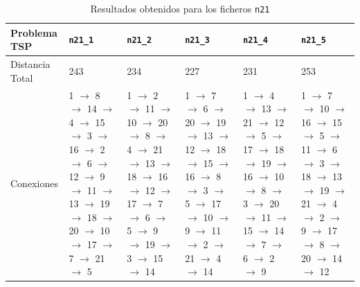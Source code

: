 \documentclass[a4paper,11pt]{article}
\begin{document}
\begin{table}[!htbp]
\label{results_n21}
\centering
\begin{tabularx}{\textwidth}{|p{2cm}|X|X|X|X|X|}
\hline
Problema TSP  & \texttt{n21\_1}	& \texttt{n21\_2}	& \texttt{n21\_3}	& \texttt{n21\_4}	& \texttt{n21\_5}	\\ \hline
Distancia Total & 243	& 234	& 227	& 231	& 253	\\ \hline
Conexiones & 1 $\to$ 8 $\to$ 14 $\to$ 4 $\to$ 15 $\to$ 3 $\to$ 16 $\to$ 2 $\to$ 6 $\to$ 12 $\to$ 9 $\to$ 11 $\to$ 13 $\to$ 19 $\to$ 18 $\to$ 20 $\to$ 10 $\to$ 17 $\to$ 7 $\to$ 21 $\to$ 5	& 1 $\to$ 2 $\to$ 11 $\to$ 10 $\to$ 20 $\to$ 8 $\to$ 4 $\to$ 21 $\to$ 13 $\to$ 18 $\to$ 16 $\to$ 12 $\to$ 17 $\to$ 7 $\to$ 6 $\to$ 5 $\to$ 9 $\to$ 19 $\to$ 3 $\to$ 15 $\to$ 14	& 1 $\to$ 7 $\to$ 6 $\to$ 20 $\to$ 19 $\to$ 13 $\to$ 12 $\to$ 18 $\to$ 15 $\to$ 16 $\to$ 8 $\to$ 3 $\to$ 5 $\to$ 17 $\to$ 10 $\to$ 9 $\to$ 11 $\to$ 2 $\to$ 21 $\to$ 4 $\to$ 14	& 1 $\to$ 4 $\to$ 13 $\to$ 21 $\to$ 12 $\to$ 5 $\to$ 17 $\to$ 18 $\to$ 19 $\to$ 16 $\to$ 10 $\to$ 8 $\to$ 3 $\to$ 20 $\to$ 11 $\to$ 15 $\to$ 14 $\to$ 7 $\to$ 6 $\to$ 2 $\to$ 9	& 1 $\to$ 7 $\to$ 10 $\to$ 16 $\to$ 15 $\to$ 5 $\to$ 11 $\to$ 6 $\to$ 3 $\to$ 18 $\to$ 13 $\to$ 19 $\to$ 21 $\to$ 4 $\to$ 2 $\to$ 9 $\to$ 17 $\to$ 8 $\to$ 20 $\to$ 14 $\to$ 12	\\ \hline
\end{tabularx}
\caption{Resultados obtenidos para los ficheros \texttt{n21}}
\end{table}
\end{document}
